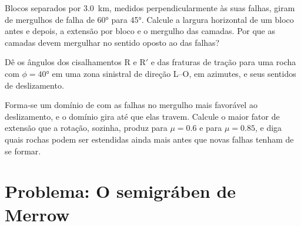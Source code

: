 \begin{exercise}[$\star\star\star$]\label{exo:b3:extension-strike-slip:10}
Blocos separados por \qty{3.0}{km}, medidos perpendicularmente às suas falhas, giram
de mergulhos de falha de \ang{60} para \ang{45}. Calcule a largura horizontal de um
bloco antes e depois, a extensão por bloco e o mergulho das camadas.
Por que as camadas devem mergulhar no sentido oposto ao das falhas?
\end{exercise}

\begin{exercise}[$\star\star\star$]\label{exo:b3:extension-strike-slip:11}
Dê os ângulos dos cisalhamentos R e R$'$ e das fraturas de tração para uma
rocha com $\phi = \ang{40}$ em uma zona sinistral de direção L--O, em
azimutes, e seus sentidos de deslizamento.
\end{exercise}

\begin{exercise}[$\star\star\star$]\label{exo:b3:extension-strike-slip:12}
Forma-se um domínio de  com as falhas no mergulho mais favorável ao
deslizamento, e o domínio gira até que elas travem. Calcule o maior fator de extensão que
a rotação, sozinha, produz para $\mu = 0.6$ e para $\mu = 0.85$, e diga quais
rochas podem ser estendidas ainda mais antes que novas falhas tenham de se formar.
\end{exercise}

\section{Problema: O semigráben de Merrow}

